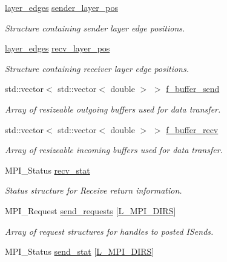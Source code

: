 \begin{DoxyCompactItemize}
\hyperlink{struct_mpi_manager_1_1layer__edges}{layer\+\_\+edges} \hyperlink{class_mpi_manager_a0cb9f8f024ec0a186374995fb203ea1e}{sender\+\_\+layer\+\_\+pos}
\begin{DoxyCompactList}\small\item\em Structure containing sender layer edge positions. \end{DoxyCompactList}\item 
\hyperlink{struct_mpi_manager_1_1layer__edges}{layer\+\_\+edges} \hyperlink{class_mpi_manager_ad1ff57a97ec56efc1690dd3a5a52fd64}{recv\+\_\+layer\+\_\+pos}
\begin{DoxyCompactList}\small\item\em Structure containing receiver layer edge positions. \end{DoxyCompactList}\item 
std\+::vector$<$ std\+::vector$<$ double $>$ $>$ \hyperlink{class_mpi_manager_aafbb74832f69a915927b9bf252bd971d}{f\+\_\+buffer\+\_\+send}
\begin{DoxyCompactList}\small\item\em Array of resizeable outgoing buffers used for data transfer. \end{DoxyCompactList}\item 
std\+::vector$<$ std\+::vector$<$ double $>$ $>$ \hyperlink{class_mpi_manager_ab8f1eeab50fd4812b3a51af1a6c43713}{f\+\_\+buffer\+\_\+recv}
\begin{DoxyCompactList}\small\item\em Array of resizeable incoming buffers used for data transfer. \end{DoxyCompactList}\item 
M\+P\+I\+\_\+\+Status \hyperlink{class_mpi_manager_a257bc27e8099f1cbf5ac70b80d8eadaa}{recv\+\_\+stat}
\begin{DoxyCompactList}\small\item\em Status structure for Receive return information. \end{DoxyCompactList}\item 
M\+P\+I\+\_\+\+Request \hyperlink{class_mpi_manager_ae4ba6735840e949dff5cd63ab1695ff0}{send\+\_\+requests} \mbox{[}\hyperlink{definitions_8h_a144328eed4e90ebcf8a9f66aa7337266}{L\+\_\+\+M\+P\+I\+\_\+\+D\+I\+RS}\mbox{]}
\begin{DoxyCompactList}\small\item\em Array of request structures for handles to posted I\+Sends. \end{DoxyCompactList}\item 
M\+P\+I\+\_\+\+Status \hyperlink{class_mpi_manager_a3ccb49ceda719f0c6bb90593a880a730}{send\+\_\+stat} \mbox{[}\hyperlink{definitions_8h_a144328eed4e90ebcf8a9f66aa7337266}{L\+\_\+\+M\+P\+I\+\_\+\+D\+I\+RS}\mbox{]}

\end{DoxyCompactItemize}
